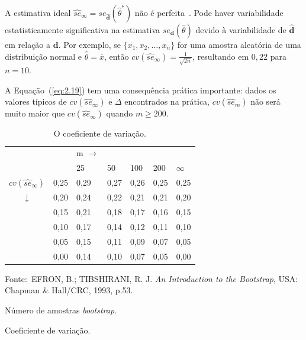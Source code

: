 A estimativa ideal $\widehat{se}_\infty = se_{\widehat{\mathbf{d}}}(\widehat{\theta}^*)$ não é perfeita~\cite{EFRON:1993}. Pode haver variabilidade estatisticamente significativa na estimativa $se_{\mathbf{d}}(\widehat{\theta})$ devido à variabilidade de $\widehat{\mathbf{d}}$ em relação a $\mathbf{d}$. Por exemplo, se $\{x_1, x_2, \ldots, x_n\}$ for uma amostra aleatória de uma distribuição normal e $\widehat{\theta} = \overline{x}$, então $cv(\widehat{se}_\infty) = \frac{1}{\sqrt{2n}}$, resultando em $0,22$ para $n = 10$.

A Equação~(\ref{eq:2.19}) tem uma consequência prática importante: dados os valores típicos de $cv(\widehat{se}_\infty)$ e $\Delta$ encontrados na prática, $cv(\widehat{se}_m)$ não será muito maior que $cv(\widehat{se}_\infty)$ quando $m \geq 200$.

\begin{table}[!htbp]
\centering
\begin{threeparttable}
\caption{O coeficiente de variação.}
\begin{tabular}{lllllll}
\hline
 &  &  m\tnote{a} $\to$ &  &  &  &  \\ 
 &  & 25 & 50 & 100 & 200 & $\infty$ \\ 
\hline
 $cv(\widehat{se}_{\infty})$\tnote{b} & 0,25 & 0,29 & 0,27 & 0,26 & 0,25 & 0,25 \\ 
\multicolumn{1}{c}{$\downarrow$} & 0,20 & 0,24 & 0,22 & 0,21 & 0,21 & 0,20 \\ 
 & 0,15 & 0,21 & 0,18 & 0,17 & 0,16 & 0,15 \\ 
 & 0,10 & 0,17 & 0,14 & 0,12 & 0,11 & 0,10 \\ 
 & 0,05 & 0,15 & 0,11 & 0,09 & 0,07 & 0,05 \\ 
 & 0,00 & 0,14 & 0,10 & 0,07 & 0,05 & 0,00 \\ 
\hline
\end{tabular}
\begin{tablenotes}[flushleft] %
    \footnotesize
    \item Fonte:~EFRON, B.; TIBSHIRANI, R. J. \textit{An Introduction to the Bootstrap}, USA: Chapman \& Hall/CRC, 1993, p.53.
	\item[a] Número de amostras \textit{bootstrap}.
	\item[b] Coeficiente de variação.
\end{tablenotes}
\label{tab:coefvaria}
\end{threeparttable}
\end{table}

